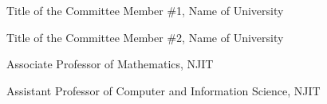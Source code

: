 

       {Title of the Committee Member \#1, Name of University}

       {Title of the Committee Member \#2, Name of University}
	
       {Associate Professor of Mathematics, NJIT}
	
       {Assistant Professor of Computer and Information Science, NJIT}
